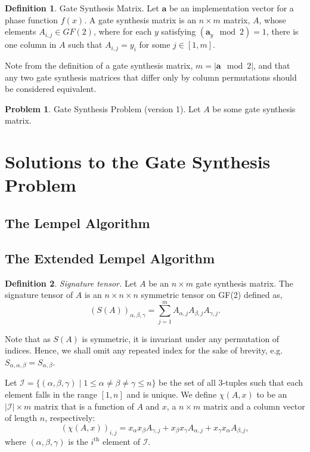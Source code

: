 \documentclass{article}
\theoremstyle{definition}
\newtheorem{definition}{Definition}[section]
\theoremstyle{problem}
\newtheorem{problem}{Problem}[section]
\theoremstyle{lemma}
\begin{document}
	\theoremstyle{definition}
	\begin{definition}{Gate Synthesis Matrix.}
		Let $\mathbf{a}$ be an implementation vector for a phase function $f(x)$. A gate synthesis matrix is an $n\times m$ matrix, $A$, whose elements $A_{i,j} \in GF(2)$, where for each $y$ satisfying $(\mathbf{a}_{y} \mod 2)=1$, there is one column in $A$ such that $A_{i,j}=y_i$ for some $j \in \left[1,m\right]$.
	\end{definition}

	Note from the definition of a gate synthesis matrix, $m = |\mathbf{a} \mod 2|$, and that any two gate synthesis matrices that differ only by column permutations should be considered equivalent.
	
	\theoremstyle{problem}
	\begin{problem}{Gate Synthesis Problem (version 1).}
		Let $A$ be some gate synthesis matrix.
	\end{problem}
	
	\section{Solutions to the Gate Synthesis Problem}
	\label{s4_Solution}
		\subsection{The Lempel Algorithm}
		\subsection{The Extended Lempel Algorithm}
		\theoremstyle{definition}
		\begin{definition}{\emph{Signature tensor.}}
			Let $A$ be an $n \times m$ gate synthesis matrix. The signature tensor of $A$ is an $n \times n \times n$ symmetric tensor on GF(2) defined as,
			\begin{equation}
			\label{e_Sig}
			\left(S(A)\right)_{\alpha,\beta,\gamma} = \sum_{j = 1}^{m}A_{\alpha,j}A_{\beta,j}A_{\gamma,j}.
			\end{equation}
		\end{definition}
	
		Note that as $S(A)$ is symmetric, it is invariant under any permutation of indices. Hence, we shall omit any repeated index for the sake of brevity, e.g. $S_{\alpha, \alpha, \beta} = S_{\alpha,\beta}$.
		
		Let $\mathcal{I} = \{\left(\alpha,\beta,\gamma\right)\mid 1 \leq \alpha \neq \beta \neq \gamma \leq n\}$ be the set of all 3-tuples such that each element falls in the range $\left[1,n\right]$ and is unique. We define $\chi(A,x)$ to be an $|\mathcal{I}| \times m$ matrix that is a function of $A$ and $x$, a $n \times m$ matrix and a column vector of length $n$, respectively:
		\begin{equation}
		\left(\chi(A,x)\right)_{i,j} = x_\alpha x_\beta A_{\gamma,j} + x_\beta x_\gamma A_{\alpha,j} + x_\gamma x_\alpha A_{\beta,j},
		\end{equation}
		where $\left(\alpha,\beta,\gamma\right)$ is the $i^\text{th}$ element of $\mathcal{I}$.
		
\end{document}
